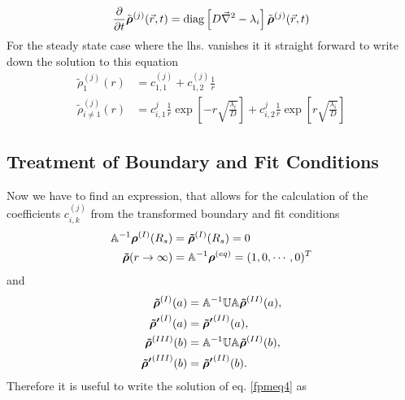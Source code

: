 \begin{equation}
    \frac{\partial }{\partial t} \tilde{\boldsymbol{\mathbf{\rho}}}^{(j)}(\vec{r},t) = {\rm diag} \left[D \vec{\nabla}^{2} - \lambda_i  \right] \tilde{\boldsymbol{\mathbf{\rho}}}^{(j)}(\vec{r},t)
    \label{fpmeq4}
\end{equation}
For the steady state case where the lhs. vanishes it it straight forward to write down the solution to this equation
\begin{align}
    \tilde{\rho}_{1}^{(j)}(r) &= c_{1,1}^{(j)} + c_{1,2}^{(j)} \frac{1}{r} \nonumber \\
    \tilde{\rho}_{i \ne 1}^{(j)}(r) &= c_{i,1}^{j}\frac{1}{r} \exp\left[-r\sqrt{\frac{\lambda_i}{D}}\right] + c_{i,2}^{j}\frac{1}{r} \exp\left[r\sqrt{\frac{\lambda_i}{D}}\right] 
    \label{fp_ind_sol}
\end{align}
\subsection{Treatment of Boundary and Fit Conditions}
\label{FBC}
Now we have to find an expression, that allows for the calculation of the coefficients $c_{i,k}^{(j)}$ from the transformed boundary and fit conditions
\begin{align}
    \mathbb{A}^{-1}\boldsymbol{\mathbf{\rho}}^{(I)}(R_s) &= \boldsymbol{\mathbf{\tilde{\rho}}}^{(I)}(R_s) = 0 \nonumber \\
    \boldsymbol{\mathbf{\tilde{\rho}}}(r \rightarrow \infty) &= \mathbb{A}^{-1} \boldsymbol{\mathbf{\rho}}^{(eq)} = (1,0,\cdots,0)^{T}
\end{align}
and
\begin{align}
    \boldsymbol{\mathbf{\tilde{\rho}}}^{(I)}(a) &= \mathbb{A}^{-1}\mathbb{U}\mathbb{A} \boldsymbol{\mathbf{\tilde{\rho}}}^{(II)}(a), \\ \nonumber
    \boldsymbol{\mathbf{\tilde{\rho} '}}^{(I)}(a) &= \boldsymbol{\mathbf{\tilde{\rho} '}}^{(II)}(a), \\ \nonumber
    \boldsymbol{\mathbf{\tilde{\rho}}}^{(III)}(b) &= \mathbb{A}^{-1}\mathbb{U}\mathbb{A} \boldsymbol{\mathbf{\tilde{\rho}}}^{(II)}(b), \\ \nonumber
    \boldsymbol{\mathbf{\tilde{\rho} '}}^{(III)}(b) &= \boldsymbol{\mathbf{\tilde{\rho} '}}^{(II)}(b).
\end{align}
Therefore it is useful to write the solution of eq. \eqref{fpmeq4} as
